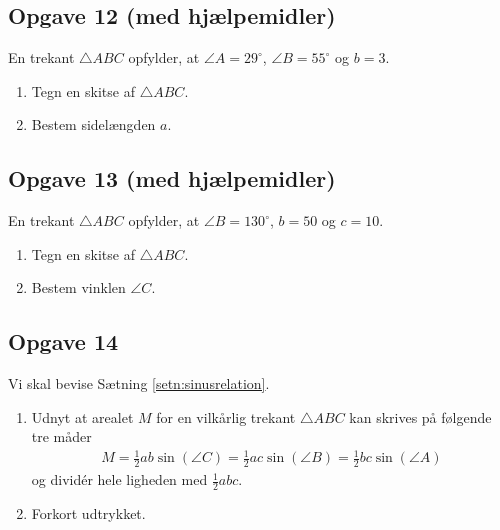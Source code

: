 \subsection*{Opgave 12 (med hjælpemidler)}
En trekant $\triangle ABC$ opfylder, at $\angle A = 29^\circ$, $\angle B = 55^\circ$ og $b = 3$.
\begin{enumerate}[label=\roman*)]
	\item Tegn en skitse af $\triangle ABC$. 
	\item Bestem sidelængden $a$.
\end{enumerate}

\subsection*{Opgave 13 (med hjælpemidler)}
En trekant $\triangle ABC$ opfylder, at $\angle B = 130^\circ$, $b = 50$ og $c = 10$.
\begin{enumerate}[label=\roman*)	]
	\item Tegn en skitse af $\triangle ABC$. 
	\item Bestem vinklen $\angle C$. 
\end{enumerate}

\subsection*{Opgave 14}
Vi skal bevise Sætning \ref{setn:sinusrelation}.
\begin{enumerate}[label=\roman*)]
	\item Udnyt at arealet $M$ for en vilkårlig trekant $\triangle ABC$ kan skrives på følgende tre måder
	\begin{align*}
		M = \frac{1}{2}ab\sin(\angle C) = \frac{1}{2}ac\sin(\angle B) = \frac{1}{2} bc\sin(\angle A)
	\end{align*}
	og dividér hele ligheden med $\frac{1}{2}abc$.
	\item Forkort udtrykket.
\end{enumerate}